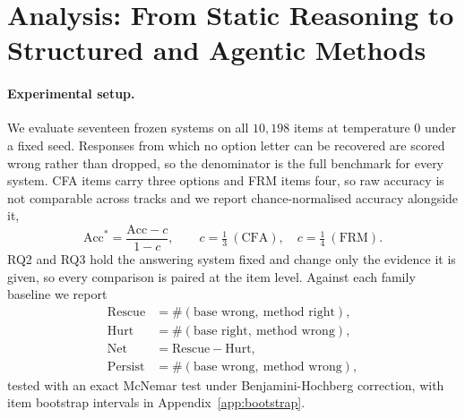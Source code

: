 %
%
\newcommand{\pending}[1]{#1}   %

\section{Analysis: From Static Reasoning to Structured and Agentic Methods}

\paragraph{Experimental setup.}
We evaluate seventeen frozen systems on all $10{,}198$ items at temperature $0$ under a fixed
seed. Responses from which no option letter can be recovered are scored wrong rather than
dropped, so the denominator is the full benchmark for every system. CFA items carry three
options and FRM items four, so raw accuracy is not comparable across tracks and we report
chance-normalised accuracy alongside it,
\begin{equation}
\mathrm{Acc}^{*}=\frac{\mathrm{Acc}-c}{1-c},
\qquad c=\tfrac{1}{3}\ (\text{CFA}),\quad c=\tfrac{1}{4}\ (\text{FRM}).
\end{equation}
RQ2 and RQ3 hold the answering system fixed and change only the evidence it is given, so every
comparison is paired at the item level. Against each family baseline we report
\begin{equation}
\begin{aligned}
\text{Rescue} &= \#(\text{base wrong},\ \text{method right}),\\
\text{Hurt}   &= \#(\text{base right},\ \text{method wrong}),\\
\text{Net}    &= \text{Rescue}-\text{Hurt},\\
\text{Persist}&= \#(\text{base wrong},\ \text{method wrong}),
\end{aligned}
\end{equation}
tested with an exact McNemar test under Benjamini-Hochberg correction, with item bootstrap
intervals in Appendix~\ref{app:bootstrap}.

